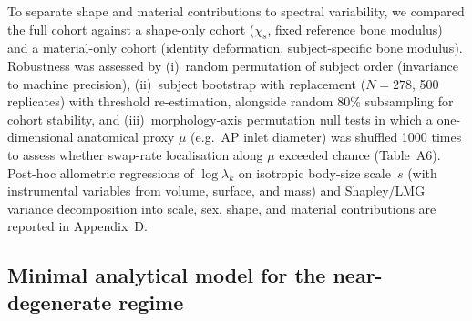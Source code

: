 \documentclass[11pt]{article}
\begin{document}
To separate shape and material contributions to spectral variability, we compared the full cohort against a shape-only cohort ($\chi_s$, fixed reference bone modulus) and a material-only cohort (identity deformation, subject-specific bone modulus).
Robustness was assessed by (i)~random permutation of subject order (invariance to machine precision), (ii)~subject bootstrap with replacement ($N{=}278$, 500 replicates) with threshold re-estimation, alongside random 80\% subsampling for cohort stability, and (iii)~morphology-axis permutation null tests in which a one-dimensional anatomical proxy $\mu$ (e.g.\ AP inlet diameter) was shuffled 1000 times to assess whether swap-rate localisation along $\mu$ exceeded chance (Table~A6).
Post-hoc allometric regressions of $\log\lambda_k$ on isotropic body-size scale~$s$ (with instrumental variables from volume, surface, and mass) and Shapley/LMG variance decomposition into scale, sex, shape, and material contributions are reported in Appendix~D.

\subsection{Minimal analytical model for the near-degenerate regime}
\label{sec:toy-methods}
\end{document}

